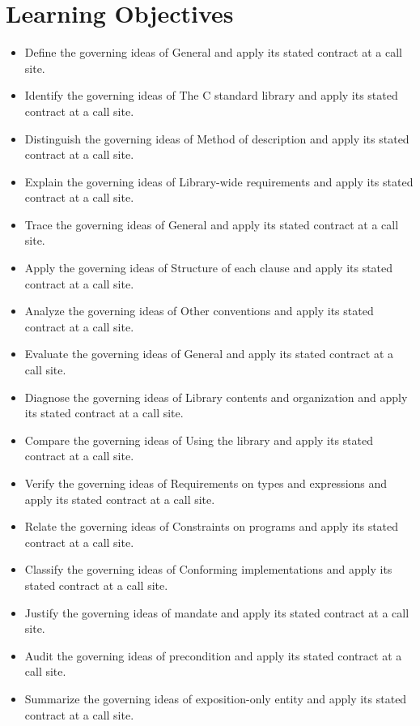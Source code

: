 \documentclass[11pt,letterpaper]{article}
\begin{document}
\section{Learning Objectives}
\begin{itemize}[label=\textcolor{CornellReferenceTeal}{$\blacktriangleright$}]
\item Define the governing ideas of General and apply its stated contract at a call site.
\item Identify the governing ideas of The C standard library and apply its stated contract at a call site.
\item Distinguish the governing ideas of Method of description and apply its stated contract at a call site.
\item Explain the governing ideas of Library-wide requirements and apply its stated contract at a call site.
\item Trace the governing ideas of General and apply its stated contract at a call site.
\item Apply the governing ideas of Structure of each clause and apply its stated contract at a call site.
\item Analyze the governing ideas of Other conventions and apply its stated contract at a call site.
\item Evaluate the governing ideas of General and apply its stated contract at a call site.
\item Diagnose the governing ideas of Library contents and organization and apply its stated contract at a call site.
\item Compare the governing ideas of Using the library and apply its stated contract at a call site.
\item Verify the governing ideas of Requirements on types and expressions and apply its stated contract at a call site.
\item Relate the governing ideas of Constraints on programs and apply its stated contract at a call site.
\item Classify the governing ideas of Conforming implementations and apply its stated contract at a call site.
\item Justify the governing ideas of mandate and apply its stated contract at a call site.
\item Audit the governing ideas of precondition and apply its stated contract at a call site.
\item Summarize the governing ideas of exposition-only entity and apply its stated contract at a call site.
\end{itemize}
\end{document}
